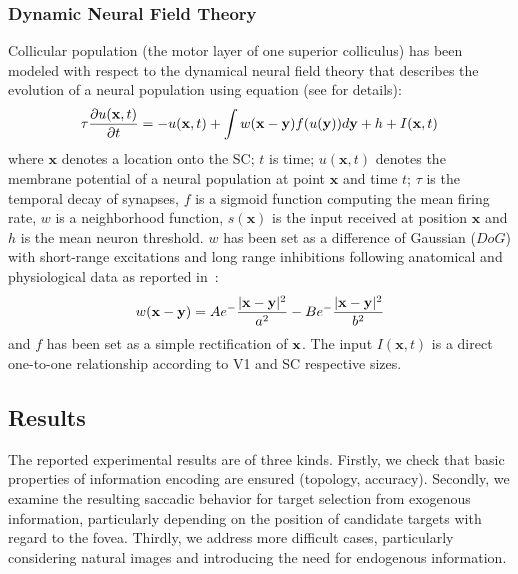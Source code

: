 \subsubsection{Dynamic Neural Field Theory}
Collicular population (the motor layer of one superior colliculus) has been
modeled with respect to the dynamical neural field theory
\cite{Wilson:1973,Amari:1977,Taylor:1999} that describes the evolution of a
neural population using equation (see \cite{Rougier:2006} for details):
\begin{equation}
   \tau \frac{\partial u(\mathbf{x},t)}{\partial t} = -u(\mathbf{x},t) +
  \int w(\mathbf{x} - \mathbf{y}) f(u(\mathbf{y})) d\mathbf{y}\\
 + h + I(\mathbf{x}, t)
    \label{eq:dnf}
\end{equation}
where $\mathbf{x}$ denotes a location onto the SC; $t$ is time; $u(\mathbf{x},
t)$ denotes the membrane potential of a neural population at point $\mathbf{x}$
and time $t$; ${\tau}$ is the temporal decay of synapses, $f$ is a sigmoid
function computing the mean firing rate, $w$ is a neighborhood function,
$s(\mathbf{x})$ is the input received at position $\mathbf{x}$ and $h$ is the
mean neuron threshold. $w$ has been set as a difference of Gaussian ($DoG$) with
short-range excitations and long range inhibitions following anatomical and
physiological data as reported in~\cite{Munoz:1998}:
\begin{equation}
  \label{eq:DoG}
  w ({\bf x}-{\bf y}) = 
    A e^-{\frac{\vert {\bf x} - {\bf y} \vert^2}{a^2}} -
    B e^-{\frac{\vert {\bf x} - {\bf y} \vert^2}{b^2}}
\end{equation}
and $f$ has been set as a simple rectification of ${\bf x}$. The input
$I(\mathbf{x},t)$ is a direct one-to-one relationship according to V1 and SC
respective sizes.





\subsection{Results}
The reported experimental results are of three kinds. Firstly, we
check that basic properties of information encoding are ensured
(topology, accuracy). Secondly, we examine the resulting saccadic
behavior for target selection from exogenous information, particularly
depending on the position of candidate targets with regard to the
fovea. Thirdly, we address more difficult cases, particularly
considering natural images and introducing the need for endogenous
information.

